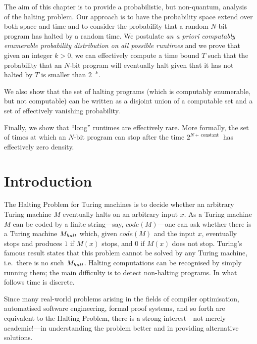 \documentclass[12pt,twoside,openright]{report}
\begin{document}
The aim of this chapter is to provide a probabilistic, but non-quantum, analysis of the halting problem.  Our approach is to have the probability space extend over both space and time and to consider the probability that a random $N$-bit program has halted by a random time. We postulate {\it an a priori computably enumerable probability distribution on all possible runtimes} and we prove that given an integer $k>0$, we can effectively compute a time bound $T$ such that the probability that an $N$-bit program will eventually halt given that it has not halted by $T$ is smaller than $2^{-k}$.  

We also show that the set of halting programs (which is computably enumerable, but not computable) can be written as a disjoint union of a computable set and a set of effectively vanishing probability.

Finally, we show that ``long'' runtimes are effectively rare. More formally, the set of times at which an $N$-bit program can stop after the time $2^{N +\,\mbox{constant }}$  has effectively zero density.

\section{Introduction}

The Halting Problem for Turing machines is to decide whether an arbitrary Turing machine $M$ eventually halts on an arbitrary input $x$. As a Turing machine $M$ can be coded by a finite string---say, $code(M)$---one can ask whether there is  a Turing machine $M_{\footnotesize halt}$ which, given  $code(M)$ and the input $x$, eventually stops and produces $1$ if $M(x)$ stops,  and $0$ if $M(x)$ does not stop. Turing's famous result states that this problem cannot be solved by any Turing machine, i.e.~there is no such  $M_{\footnotesize halt}$. Halting computations can be recognised by simply running them; the main difficulty is to detect non-halting programs. In what follows time is discrete.

Since many real-world problems arising in the fields of compiler optimisation, automatised software engineering, formal proof systems, and so forth are equivalent to the Halting Problem, there is a strong interest---not merely academic!---in understanding the problem better and in providing alternative solutions.
\end{document}
